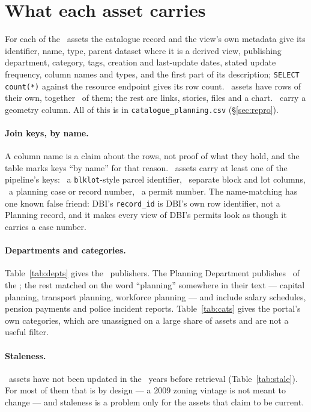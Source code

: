 \documentclass[11pt]{article}
\begin{document}
\section{What each asset carries}

For each of the \catTotal\ assets the catalogue record and the view's own metadata give its
identifier, name, type, parent dataset where it is a derived view, publishing department,
category, tags, creation and last-update dates, stated update frequency, column names and
types, and the first part of its description; \texttt{SELECT count(*)} against the resource
endpoint gives its row count. \catWithRows\ assets have rows of their own, together
\catRowsTotal\ of them; the rest are links, stories, files and a chart. \catGeom\ carry a
geometry column. All of this is in \texttt{catalogue\_planning.csv} (\S\ref{sec:repro}).

\paragraph{Join keys, by name.} A column name is a claim about the rows, not proof of what
they hold, and the table marks keys ``by name'' for that reason. \catKeyAny\ assets carry at
least one of the pipeline's keys: \catKeyBlklot\ a \texttt{blklot}-style parcel identifier,
\catKeyBlockLot\ separate block and lot columns, \catKeyCase\ a planning case or record
number, \catKeyPermit\ a permit number. The name-matching has one known false friend: DBI's
\texttt{record\_id} is DBI's own row identifier, not a Planning record, and it makes every
view of DBI's permits look as though it carries a case number.

\paragraph{Departments and categories.} Table~\ref{tab:depts} gives the \catDepartments\
publishers. The Planning Department publishes \catPlanningDept\ of the \catTotal; the rest
matched on the word ``planning'' somewhere in their text --- capital planning, transport
planning, workforce planning --- and include salary schedules, pension payments and police
incident reports. Table~\ref{tab:cats} gives the portal's own categories, which are
unassigned on a large share of assets and are not a useful filter.

\paragraph{Staleness.} \catStale\ assets have not been updated in the \catStaleYears\ years
before retrieval (Table~\ref{tab:stale}). For most of them that is by design --- a 2009
zoning vintage is not meant to change --- and staleness is a problem only for the assets
that claim to be current.
\end{document}
